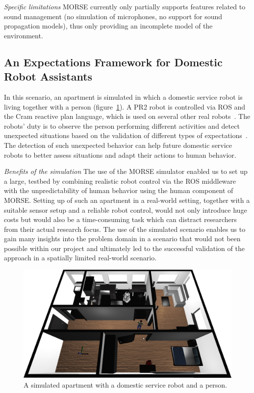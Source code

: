\documentclass{llncs}
\begin{document}
\emph{Specific limitations} MORSE currently only partially supports features
related to sound management (no simulation of microphones, no support for sound
propagation models), thus only providing an incomplete model of the environment.

\subsection{An Expectations Framework for Domestic Robot Assistants}
\label{sc:expectations}

In this scenario, an apartment is simulated in which a domestic 
service robot is living together with a person (figure~\ref{fig|apartment}). 
A PR2 robot is controlled via ROS and the {\sc Cram} reactive plan language, 
which is used on several other real robots~\cite{pancakes11humanoids}. The robots' 
duty is to observe the person performing different activities and detect unexpected 
situations based on the validation of different types of expectations~\cite{Karg2013}. 
The detection of such unexpected behavior can help future domestic service robots 
to better assess situations and adapt their actions to human behavior.

\emph{Benefits of the simulation} The use of the MORSE simulator enabled us to set up a large, 
testbed by combining realistic robot control via the ROS middleware with the
unpredictability of human behavior using the human component of MORSE. Setting
up of such an apartment in a real-world setting, together with a suitable
sensor setup and a reliable robot control, would not only introduce huge costs
but would also be a time-consuming task which can distract researchers from
their actual research focus. The use of the simulated scenario enables us to
gain many insights into the problem domain in a scenario that would not been
possible within our project and ultimately led to the successful validation of
the approach in a spatially limited real-world scenario.

\begin{figure}[t]
      \centering
      \includegraphics[width=0.7\linewidth]{morse_apartment.png}
      \caption{A simulated apartment with a domestic service robot and a person.}
      \label{fig|apartment}
\end{figure}
\end{document}
